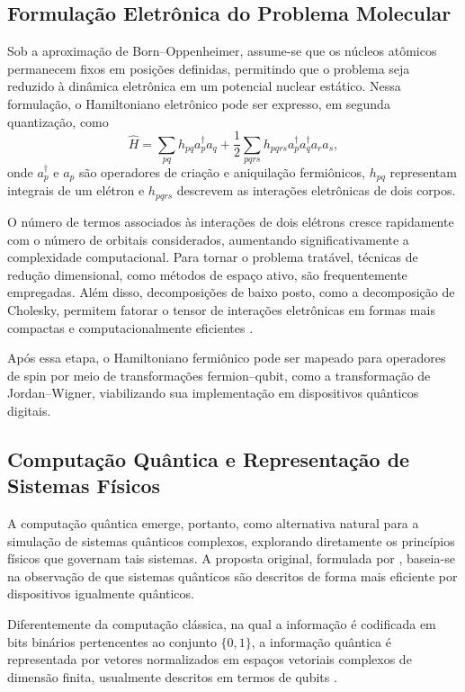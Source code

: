 \subsection{Formulação Eletrônica do Problema Molecular}

Sob a aproximação de Born–Oppenheimer, assume-se que os núcleos
atômicos permanecem fixos em posições definidas,
permitindo que o problema seja reduzido à dinâmica eletrônica
em um potencial nuclear estático.
Nessa formulação, o Hamiltoniano eletrônico pode ser expresso,
em segunda quantização, como
\begin{equation}
\hat{H} =
\sum_{pq} h_{pq} a_p^\dagger a_q
+
\frac{1}{2}
\sum_{pqrs} h_{pqrs}
a_p^\dagger a_q^\dagger a_r a_s,
\end{equation}
onde $a_p^\dagger$ e $a_p$ são operadores de criação e aniquilação
fermiônicos, $h_{pq}$ representam integrais de um elétron
e $h_{pqrs}$ descrevem as interações eletrônicas de dois corpos.

O número de termos associados às interações de dois elétrons cresce
rapidamente com o número de orbitais considerados,
aumentando significativamente a complexidade computacional.
Para tornar o problema tratável, técnicas de redução dimensional,
como métodos de espaço ativo,
são frequentemente empregadas.
Além disso, decomposições de baixo posto,
como a decomposição de Cholesky,
permitem fatorar o tensor de interações eletrônicas em formas
mais compactas e computacionalmente eficientes
\cite{cohn2021quantum, motta2018lowrank}.

Após essa etapa, o Hamiltoniano fermiônico pode ser mapeado
para operadores de spin por meio de transformações
fermion–qubit, como a transformação de Jordan–Wigner,
viabilizando sua implementação em dispositivos quânticos digitais.

\subsection{Computação Quântica e Representação de Sistemas Físicos}

A computação quântica emerge, portanto, como alternativa natural
para a simulação de sistemas quânticos complexos,
explorando diretamente os princípios físicos que governam tais sistemas.
A proposta original, formulada por \textcite{feynman1982simulating},
baseia-se na observação de que sistemas quânticos são descritos
de forma mais eficiente por dispositivos igualmente quânticos.

Diferentemente da computação clássica, na qual a informação é codificada
em bits binários pertencentes ao conjunto $\{0,1\}$,
a informação quântica é representada por vetores normalizados em
espaços vetoriais complexos de dimensão finita, usualmente descritos
em termos de qubits \textcite{nielsen2000quantum}.

